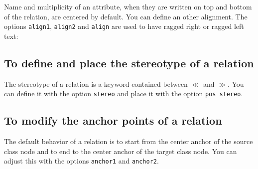 \documentclass[a4paper,11pt]{report}
\begin{document}
Name and multiplicity of an attribute, when they are written on top and bottom of the relation, are centered by default. You can define an other alignment.
The options {\tt align1}, {\tt align2} and {\tt align} are used to have ragged right or ragged left text:

\medskip

\begin{minipage}{0.5\textwidth}

\end{minipage}
\begin{minipage}{0.4\textwidth}
\begin{center}
\end{center}
\end{minipage}

\subsection{To define and place the stereotype of a relation}\label{ss.relstereo}

The stereotype of a relation is a keyword contained between $\ll$ and $\gg$. 
You can define it with the option {\tt stereo} and place it with the option \hypertarget{posstereo}{{\tt pos stereo}}.

\medskip

\begin{minipage}{0.5\textwidth}

\end{minipage}
\begin{minipage}{0.4\textwidth}
\begin{center}
\end{center}
\end{minipage}

\subsection{To modify the anchor points of a relation}\label{ss.relanchor}

The default behavior of a relation is to start from the center anchor of the source class node and to end to the center anchor of the target class node.
You can adjust this with the options \hypertarget{anchor1}{{\tt anchor1}} and \hypertarget{anchor2}{{\tt anchor2}}.

\medskip

\begin{minipage}{0.6\textwidth}

\end{minipage}
\begin{minipage}{0.4\textwidth}
\begin{center}
\end{center}
\end{minipage}
\end{document}
